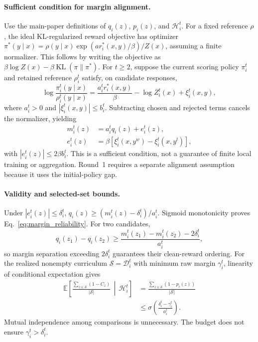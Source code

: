\paragraph{Sufficient condition for margin alignment.}
Use the main-paper definitions of $q_i(z)$, $p_i(z)$, and
$\mathcal{H}_i^t$. For a fixed reference $\rho$, the ideal
KL-regularized reward objective has optimizer
$\pi^*(y\mid x)=\rho(y\mid x)
\exp(a r_i^*(x,y)/\beta)/Z(x)$, assuming a finite normalizer.
This follows by writing the objective as
$\beta\log Z(x)-\beta\operatorname{KL}(\pi\|\pi^*)$.
For $t\geq2$, suppose the current scoring policy $\pi_i^t$ and
retained reference $\rho_i^t$ satisfy, on candidate responses,
\begin{equation}\label{eq:app_ideal_policy}
\log\frac{\pi_i^t(y\mid x)}{\rho_i^t(y\mid x)}
=\frac{a_i^t r_i^*(x,y)}{\beta}
-\log Z_i^t(x)+\xi_i^t(x,y),
\end{equation}
where $a_i^t>0$ and $|\xi_i^t(x,y)|\leq b_i^t$.
Subtracting chosen and rejected terms cancels the normalizer, yielding
\begin{equation}\label{eq:app_margin_approx}
\begin{aligned}
m_i^t(z)&=a_i^tq_i(z)+e_i^t(z),\\
e_i^t(z)&=\beta[\xi_i^t(x,y^w)-\xi_i^t(x,y^l)],
\end{aligned}
\end{equation}
with $|e_i^t(z)|\leq2\beta b_i^t$.
This is a sufficient condition, not a guarantee of finite local
training or aggregation. Round~1 requires a separate alignment
assumption because it uses the initial-policy gap.

\paragraph{Validity and selected-set bounds.}
Under $|e_i^t(z)|\leq\delta_i^t$,
$q_i(z)\geq(m_i^t(z)-\delta_i^t)/a_i^t$.
Sigmoid monotonicity proves Eq.~\eqref{eq:margin_reliability}.
For two candidates,
\begin{equation}
q_i(z_1)-q_i(z_2)
\geq\frac{m_i^t(z_1)-m_i^t(z_2)-2\delta_i^t}{a_i^t},
\end{equation}
so margin separation exceeding $2\delta_i^t$ guarantees their
clean-reward ordering. For the realized nonempty curriculum
$\mathcal{S}=\mathcal{D}_i^t$ with minimum raw margin $\gamma_i^t$,
linearity of conditional expectation gives
\begin{equation}\label{eq:app_selected_errors}
\begin{aligned}
\mathbb{E}\!\left[
\frac{\sum_{z\in\mathcal{S}}(1-C_z)}{|\mathcal{S}|}
\,\middle|\,\mathcal{H}_i^t\right]
&=\frac{\sum_{z\in\mathcal{S}}(1-p_i(z))}{|\mathcal{S}|}\\
&\leq\sigma\!\left(
\frac{\delta_i^t-\gamma_i^t}{a_i^t}\right).
\end{aligned}
\end{equation}
Mutual independence among comparisons is unnecessary.
The budget does not ensure $\gamma_i^t>\delta_i^t$.

